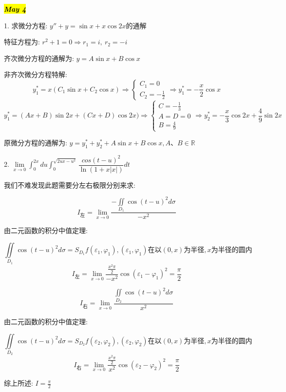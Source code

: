 \hl{\textbf{\textit{May 4}}}

1. 求微分方程: $y''+y=\sin x+x\cos 2x$的通解
\begin{solution}
	
	特征方程为: $r^2+1=0\Rightarrow r_{1}=i,\ r_{2}=-i$
	
	齐次微分方程的通解为: $y=A\sin x+B\cos x$
	
	非齐次微分方程特解: 
	$$y_{1}^{*}=x(C_{1}\sin x+C_{2}\cos x)\Rightarrow \left\lbrace 
	\begin{array}{l}
		C_{1}=0\\
		C_{2}=-\frac{1}{2}
	\end{array}
	\right. \Rightarrow y_{1}^{*}=-\frac{x}{2}\cos x$$
	$$y_{1}^{*}=(Ax+B)\sin 2x+(Cx+D)\cos 2x)\Rightarrow \left\lbrace 
	\begin{array}{l}
		C=-\frac{1}{3}\\
		A=D=0\\
		B=\frac{4}{9}
	\end{array}
	\right.\Rightarrow y_{2}^{*}=-\frac{x}{3}\cos 2x+\frac{4}{9}\sin 2x $$
	
	原微分方程的通解为: $y=y_{1}^{*}+y_{2}^{*}+A\sin x+B\cos x,A\text{、}B\in \mathbb{R}$
\end{solution}

2. $\lim\limits_{x\rightarrow 0 }\int_{0}^{2x}du\int_{0}^{\sqrt{2ux-u^2}}\dfrac{cos(t-u)^2}{\ln(1+x|x|)}dt$
\begin{solution}
	
	我们不难发现此题需要分左右极限分别来求: 
	
	$$I_{\text{左}}=\lim\limits_{x\rightarrow 0 }\frac{-\iint\limits_{D_{1}}\cos(t-u)^2d\sigma}{-x^2}$$
	
	由二元函数的积分中值定理: 
	
	$$\iint\limits_{D_{1}}\cos(t-u)^2d\sigma=S_{D_{1}}f(\varepsilon_{1},\varphi_{1}),(\varepsilon_{1},\varphi_{1})\text{在以}(0,x)\text{为半径},x
	\text{为半径的圆内}$$
	$$I_{\text{左}}=\lim\limits_{x\rightarrow 0 }\frac{\frac{x^2\pi}{2}}{-x^2}\cos(\varepsilon_{1}-\varphi_{1})^2=\frac{\pi}{2}$$
	
	$$I_{\text{右}}=\lim\limits_{x\rightarrow 0 }\frac{\iint\limits_{D_{2}}\cos(t-u)^2d\sigma}{x^2}$$
	
	由二元函数的积分中值定理: 
	
	$$\iint\limits_{D_{2}}\cos(t-u)^2d\sigma=S_{D_{2}}f(\varepsilon_{2},\varphi_{2}),(\varepsilon_{2},\varphi_{2})\text{在以}(0,x)\text{为半径},x
	\text{为半径的圆内}$$
	$$I_{\text{右}}=\lim\limits_{x\rightarrow 0 }\frac{\frac{x^2\pi}{2}}{x^2}\cos(\varepsilon_{2}-\varphi_{2})^2=\frac{\pi}{2}$$
	
	综上所述: $I=\frac{\pi}{2}$
\end{solution}

